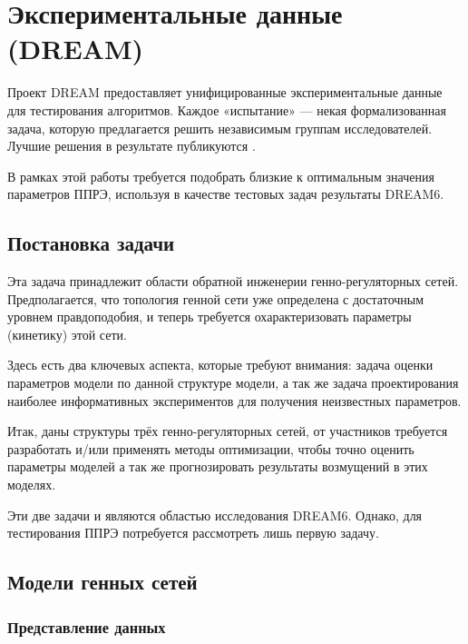\chapter{Экспериментальные данные (DREAM)} \label{chapt2}

Проект DREAM предоставляет унифицированные экспериментальные данные для 
тестирования алгоритмов. Каждое «испытание» — некая формализованная задача,
которую предлагается решить независимым группам исследователей. Лучшие 
решения в результате публикуются \cite{bib6}. 

В рамках этой работы требуется подобрать близкие к оптимальным значения 
параметров ППРЭ, используя в качестве тестовых задач результаты DREAM6.

\section{Постановка задачи} \label{sect2_1}

Эта задача принадлежит области обратной инженерии генно-регуляторных сетей. 
Предполагается, что топология генной сети уже определена с достаточным уровнем 
правдоподобия, и теперь требуется охарактеризовать параметры (кинетику) 
этой сети.

Здесь есть два ключевых аспекта, которые требуют внимания: задача оценки 
параметров модели по данной структуре модели, а так же задача проектирования 
наиболее информативных экспериментов для получения неизвестных параметров. 

Итак, даны структуры трёх генно-регуляторных сетей, от участников требуется 
разработать и/или применять методы оптимизации, чтобы точно оценить 
параметры моделей а так же прогнозировать результаты возмущений в этих моделях.

Эти две задачи и являются областью исследования DREAM6. Однако, для тестирования
ППРЭ потребуется рассмотреть лишь первую задачу.

\section{Модели генных сетей} \label{sect2_2}
\subsection{Представление данных} \label{sect2_2_1}

